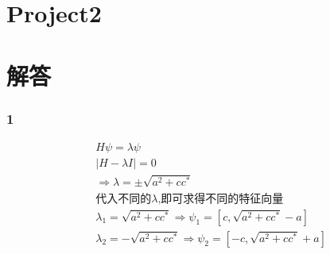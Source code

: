 \documentclass[UTF8,a4paper,10pt]{ctexart}
\begin{document}
\section*{Project2}
  \section{解答}
  \subsubsection{1}
  \begin{equation}
      \begin{aligned}
          &H\psi=\lambda\psi\\
          &|H-\lambda I|=0\\
          &\Longrightarrow\lambda=\pm \sqrt{a^2+cc^{*}}\\
          &\text{代入不同的}\lambda\text{,即可求得不同的特征向量}\\
          &\lambda_{1}=\sqrt{a^2+cc^{*}}\Longrightarrow\psi_{1}=[c,\sqrt{a^2+cc^{*}}-a]\\
          &\lambda_{2}=-\sqrt{a^2+cc^{*}}\Longrightarrow\psi_{2}=[-c,\sqrt{a^2+cc^{*}}+a]
      \end{aligned}
  \end{equation}
\end{document}
